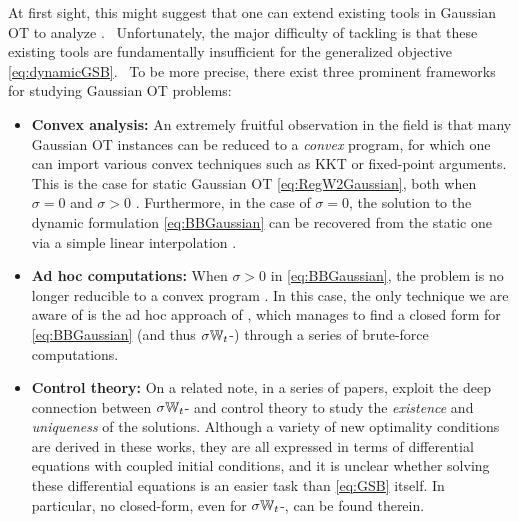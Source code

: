 At first sight, this might suggest that one can extend existing tools in Gaussian \acrshort{OT} to analyze .%
~Unfortunately, the major difficulty of tackling  is that these existing tools are fundamentally insufficient for the generalized objective \eqref{eq:dynamicGSB}. 
~To be more precise, there exist three prominent frameworks for studying Gaussian \acrshort{OT} problems:%
\begin{itemize}[leftmargin=.4cm,itemsep=.0cm,topsep=.0cm]
\item \textbf{Convex analysis:} An extremely fruitful observation in the field is that many Gaussian \acrshort{OT} instances can be reduced to a \emph{convex} program, for which one can import various convex techniques such as KKT or fixed-point arguments. This is the case for static Gaussian \acrshort{OT} \eqref{eq:RegW2Gaussian}, both when $\sigma = 0$ \citep{dowson1982frechet, olkin1982distance, bhatia2019bures} and $\sigma>0$ \citep{janati2020entropic}. Furthermore, in the case of $\sigma=0$, the solution to the dynamic formulation \eqref{eq:BBGaussian} can be recovered from the static one via a simple linear interpolation \citep{mccann1997convexity}.

\item \textbf{Ad hoc computations:} When $\sigma>0$ in \eqref{eq:BBGaussian}, the problem is no longer reducible to a convex program \citep{leonard2013survey, chen2021stochastic}. In this case, the only technique we are aware of is the ad hoc approach of \citep{mallasto2021entropy}, which manages to find a closed form for \eqref{eq:BBGaussian} (and thus $\sigma\mathbb{W}_{t}$-) through a series of brute-force computations.

\item \textbf{Control theory:} On a related note, in a series of papers, \citet{chen2015optimal,chen2016relation,chen2018optimal} exploit the deep connection between $\sigma\mathbb{W}_{t}$- and control theory to study the \emph{existence} and \emph{uniqueness} of the solutions. Although a variety of new optimality conditions are derived in these works, they are all expressed in terms of differential equations with coupled initial conditions, and it is unclear whether solving these differential equations is an easier task than \eqref{eq:GSB} itself. In particular, no closed-form, even for $\sigma\mathbb{W}_{t}$-, can be found therein.
\end{itemize}

